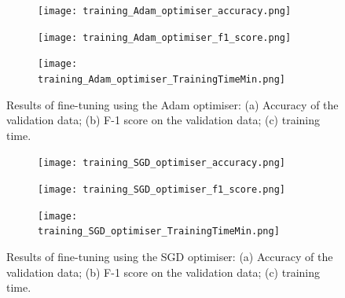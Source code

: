 \documentclass[a4paper,12pt]{article}
\newcommand{\figwidthh}{0.48\textwidth}
\begin{document}
\begin{figure}[p] 
	\begin{center}
		\begin{subfigure}[b]{\figwidthh}
			\caption{} 
			\texttt{[image: training\_Adam\_optimiser\_accuracy.png]}
		\end{subfigure}
        \hfill
		\begin{subfigure}[b]{\figwidthh}
			\caption{}
			\texttt{[image: training\_Adam\_optimiser\_f1\_score.png]}
		\end{subfigure}
        \hfill
		\begin{subfigure}[b]{\figwidthh}
			\caption{}
			\texttt{[image: training\_Adam\_optimiser\_TrainingTimeMin.png]}
		\end{subfigure}
	\end{center}
	\caption{Results of fine-tuning using the Adam optimiser: (a) Accuracy of the validation data; (b) F-1 score on the validation data; (c) training time. 
	} 
	\label{fig:res_training_adam}
\end{figure}

\begin{figure}[p] 
	\begin{center}
		\begin{subfigure}[b]{\figwidthh}
			\caption{} 
			\texttt{[image: training\_SGD\_optimiser\_accuracy.png]}
		\end{subfigure}
        \hfill
		\begin{subfigure}[b]{\figwidthh}
			\caption{}
			\texttt{[image: training\_SGD\_optimiser\_f1\_score.png]}
		\end{subfigure}
        \hfill
		\begin{subfigure}[b]{\figwidthh}
			\caption{}
			\texttt{[image: training\_SGD\_optimiser\_TrainingTimeMin.png]}
		\end{subfigure}
	\end{center}
	\caption{Results of fine-tuning using the SGD optimiser: (a) Accuracy of the validation data; (b) F-1 score on the validation data; (c) training time. 
	} 
	\label{fig:res_training_SGD}
\end{figure}





    


\clearpage

\newpage

\end{document}
